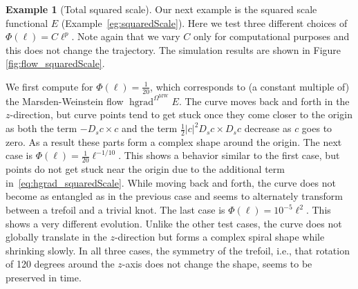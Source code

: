 \documentclass[12pt]{amsart}
\theoremstyle{definition}
\newtheorem{example}[theorem]{Example}
\newcommand{\R}{\mathbb R}
\newcommand{\id}{\mathrm{id}}
\newcommand{\Imm}{\mathrm{Imm}}
\newcommand{\OmMW}{\Omega^{\operatorname{MW}}}
\def\Om{\Omega}
\def\x{\times}
\def\R{{\mathbb R}}
\let\on=\operatorname
\begin{document}
 

\begin{example}[Total squared scale]
    Our next example is the squared scale functional $E$ (Example~\ref{eg:squaredScale}). Here we test three different choices of $\Phi(\ell)=C\ell^{p}$. Note again that we vary $C$ only for computational purposes and this does not change the trajectory. The simulation results are shown in Figure \ref{fig:flow_squaredScale}.
    
    We first compute for $\Phi(\ell)=\frac{1}{20}$, which corresponds to (a constant multiple of) the Marsden-Weinstein flow $\on{hgrad}^{\OmMW}E$. The curve moves back and forth in the $z$-direction, but curve points tend to get stuck once they come closer to the origin as both the term $-D_s c\x c$ and the term $\frac{1}{2}|c|^2 D_s c\x D_s c$ decrease as $c$ goes to zero. As a result these parts form a complex shape around the origin. The next case is  $\Phi(\ell)=\frac{1}{20}\ell^{-1/10}$. This shows a behavior similar to the first case, but points do not get stuck near the origin due to the additional term in~\eqref{eq:hgrad_squaredScale}. While moving back and forth, the curve does not become as entangled as in the previous case and seems to alternately transform between a trefoil and a trivial knot. The last case is  $\Phi(\ell)=10^{-5}\ell^{2}$. This shows a very different evolution. Unlike the other test cases, the curve does not globally translate in the $z$-direction but forms a complex spiral  shape while shrinking slowly. In all three cases, the symmetry of the trefoil, i.e., that  rotation of 120 degrees around the $z$-axis does not change the shape, seems to be preserved in time. 
    


\end{example}
\end{document}
